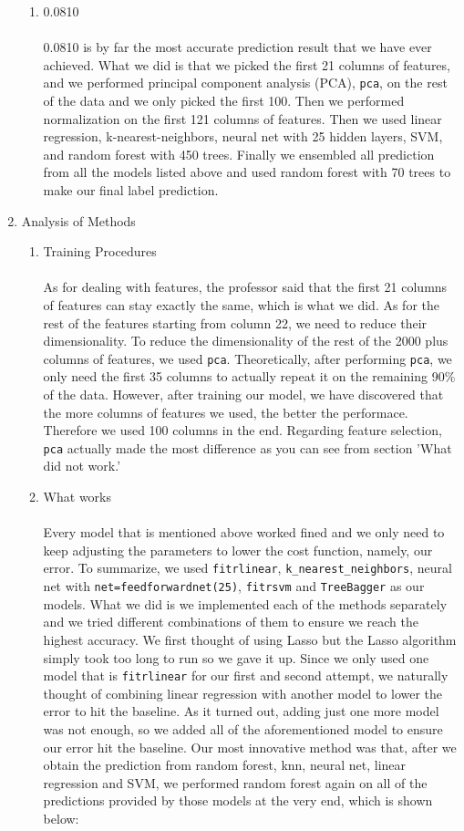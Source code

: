 \documentclass[english]{article}
\begin{document}
\begin{enumerate}
\begin{enumerate}
      \item 0.0810\\\\
      0.0810 is by far the most accurate prediction result that we have ever achieved. What we did is that we picked the first 21 columns of features, and we performed principal component analysis (PCA), \texttt{pca}, on the rest of the data and we only picked the first 100. Then we performed normalization on the first 121 columns of features. Then we used linear regression, k-nearest-neighbors, neural net with 25 hidden layers, SVM, and random forest with 450 trees. Finally we ensembled all prediction from all the models listed above and used random forest with 70 trees to make our final label prediction.
  \end{enumerate}
\item Analysis of Methods
\begin{enumerate}
  \item Training Procedures\\\\
      As for dealing with features, the professor said that the first 21 columns of features can stay exactly the same, which is what we did. As for the rest of the features starting from column 22, we need to reduce their dimensionality. To reduce the dimensionality of the rest of the 2000 plus columns of features, we used \texttt{pca}. Theoretically, after performing \texttt{pca}, we only need the first 35 columns to actually repeat it on the remaining 90\% of the data. However, after training our model, we have discovered that the more columns of features we used, the better the performace. Therefore we used 100 columns in the end. Regarding feature selection, \texttt{pca} actually made the most difference as you can see from section 'What did not work.'\\
  \item What works\\\\
        Every model that is mentioned above worked fined and we only need to keep adjusting the parameters to lower the cost function, namely, our error. To summarize, we used \texttt{fitrlinear}, \texttt{k\_nearest\_neighbors}, neural net with \texttt{net=feedforwardnet(25)}, \texttt{fitrsvm} and \texttt{TreeBagger} as our models. What we did is we implemented each of the methods separately and we tried different combinations of them to ensure we reach the highest accuracy. We first thought of using Lasso but the Lasso algorithm simply took too long to run so we gave it up. Since we only used one model that is \texttt{fitrlinear} for our first and second attempt, we naturally thought of combining linear regression with another model to lower the error to hit the baseline. As it turned out, adding just one more model was not enough, so we added all of the aforementioned model to ensure our error hit the baseline. Our most innovative method was that, after we obtain the prediction from random forest, knn, neural net, linear regression and SVM, we performed random forest again on all of the predictions provided by those models at the very end, which is shown below:

\end{enumerate}
\end{enumerate}
\end{document}
